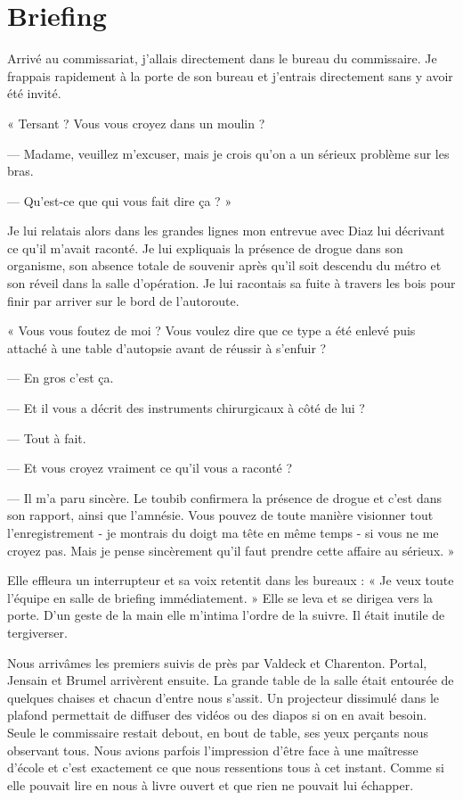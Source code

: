 \chapter{Briefing}

Arrivé au commissariat, j'allais directement dans le bureau du commissaire. Je frappais rapidement à la porte de son
bureau et j'entrais directement sans y avoir été invité.

« Tersant ? Vous vous croyez dans un moulin ?

— Madame, veuillez m'excuser, mais je crois qu'on a un sérieux problème sur les bras.

— Qu'est-ce que qui vous fait dire ça ? »

Je lui relatais alors dans les grandes lignes mon  entrevue avec Diaz lui décrivant ce qu'il m'avait raconté. Je lui
expliquais la présence de drogue dans son organisme, son absence totale de souvenir après qu'il soit descendu du
métro et son réveil dans la salle d'opération. Je lui racontais sa fuite à travers les bois pour finir par arriver 
sur le bord de l'autoroute.

« Vous vous foutez de moi ? Vous voulez dire que ce type a été enlevé puis attaché à une table d'autopsie avant de
réussir à s'enfuir ?

— En gros c'est ça.

— Et il vous a décrit des instruments chirurgicaux à côté de lui ?

— Tout à fait.

— Et vous croyez vraiment ce qu'il vous a raconté ?

— Il m'a paru sincère. Le toubib confirmera la présence de drogue et c'est dans son rapport, ainsi que l'amnésie. Vous
pouvez de toute manière visionner tout l'enregistrement - je montrais du doigt ma tête en même temps - si vous ne me
croyez pas. Mais je pense sincèrement qu'il faut prendre cette affaire au sérieux. »

Elle effleura un interrupteur et sa voix retentit dans les bureaux : « Je veux toute l'équipe en salle de briefing
immédiatement. » Elle se leva et se dirigea vers la porte. D'un geste de la main elle m'intima l'ordre de la suivre. Il
était inutile de tergiverser. 

Nous arrivâmes les premiers suivis de près par Valdeck et Charenton. Portal, Jensain et Brumel arrivèrent ensuite. La
grande table de la salle était entourée de quelques chaises et chacun d'entre nous s'assit. Un projecteur dissimulé 
dans le plafond permettait de diffuser des vidéos ou des diapos si on en avait besoin. Seule le commissaire restait 
debout, en bout de table, ses yeux perçants nous observant tous. Nous avions parfois l'impression d'être face à une 
maîtresse d'école et c'est exactement ce que nous ressentions tous à cet instant. Comme si elle pouvait lire en nous à 
livre ouvert et que rien ne pouvait lui échapper.

